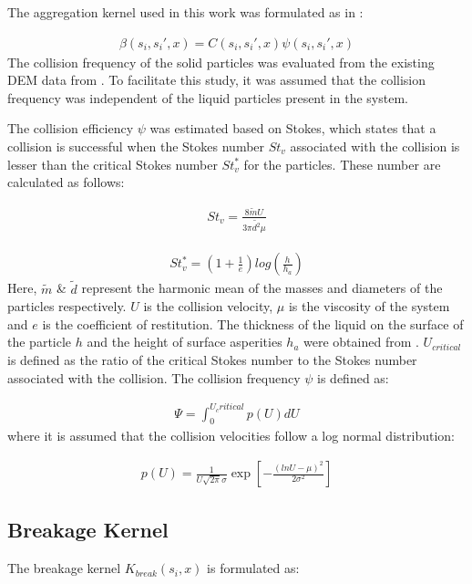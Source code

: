 \documentclass[review]{elsarticle}
\begin{document}
\begin{linenumbers}
The aggregation kernel used in this work was formulated as in \cite{Barrasso2015ces}: 

\begin{align}
\beta(s_i,s_i',x)=C(s_i,s_i',x)\psi(s_i,s_i',x)
\label{eqn:mthds_pbm_beta_kernal}
\end{align}
The collision frequency of the solid particles was evaluated from the existing 
DEM data from \citep{Sampat2018}. To facilitate this study, it was assumed that
the collision frequency was independent of the liquid particles present in the 
system.

The collision efficiency $\psi$ was estimated based on Stokes, which 
states that a collision is successful when the Stokes number $St_v$ associated 
with the collision is lesser than the critical Stokes number ${St^*_v}$ for the 
particles. These number are calculated as follows:

\begin{align}
St_v=\frac{8\tilde{m}U}{3\pi\tilde{d^2}\mu}
\label{eqn:mthds_pbm_agg_Stnum}
\end{align}

\begin{align}
St^*_v=\left(1+\frac{1}{e}\right)log\left(\frac{h}{h_a}\right)
\label{eqn:mthds_pbm_agg_cricSt}
\end{align}
Here, $\tilde{m}$ \& $\tilde{d}$ represent the harmonic mean of the masses and 
diameters of the particles respectively. $U$ is the collision velocity, $\mu$ is the 
viscosity of the system and $e$ is the coefficient of restitution. The thickness of 
the liquid on the surface of the particle $h$ and the height of surface asperities 
$h_a$ were obtained from \citep{Barrasso2015ces}. $U_{critical}$ is defined as the 
ratio of the critical Stokes number to the Stokes number associated with the collision. 
The collision frequency $\psi$ is defined as:

\begin{align}
\Psi = \int_0^{U_critical} p(U)dU
\label{eqn:mthds_pbm_agg_psi}
\end{align}
where it is assumed that the collision velocities follow a log normal distribution:


\begin{align}
p(U) = \frac{1}{U\sqrt{2\pi}\sigma}\exp\left[-\frac{(lnU-\mu)^2}{2\sigma^2}\right]
\label{eqn:mthds_pbm_agg_lognormVelo}
\end{align}



\subsection{Breakage Kernel}
\label{app:breakKernel}
The breakage kernel $K_{break}(s_i,x)$ is formulated as: 


\end{linenumbers}
\end{document}
